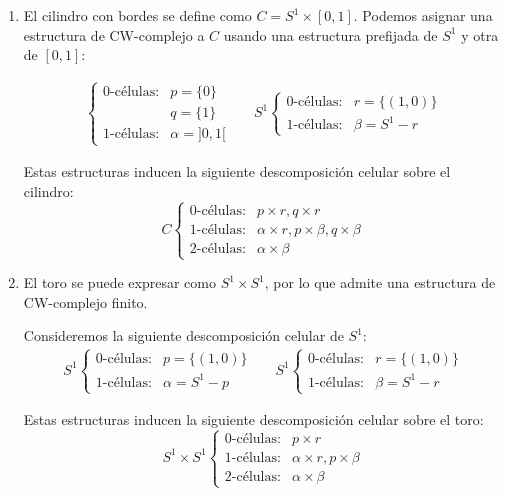 \begin{example}
\begin{enumerate}
\item El cilindro con bordes se define como $C=S^1\times [0,1]$. Podemos
asignar una estructura de CW-complejo a $C$ usando una estructura prefijada
de $S^1$ y otra de $[0,1]$:

\begin{align*}
[0,1]
\begin{cases}
\text{0-células:}	&p=\{0\}\\
					&q=\{1\}\\
\text{1-células:}	&\alpha=]0,1[
\end{cases}
&&
S^1
\begin{cases}
\text{0-células:}	&r=\{(1,0)\}\\
\text{1-células:}	&\beta=S^1-r
\end{cases}
\end{align*}

Estas estructuras inducen la siguiente descomposición celular sobre el cilindro:
\[C \begin{cases}
\text{0-células:}	&p\times r, q\times r\\
\text{1-células:}	&\alpha \times r, p\times \beta, q\times \beta\\
\text{2-células:}	&\alpha \times \beta
\end{cases}\]

\item El toro se puede expresar como $S^1\times S^1$, por lo que admite una
estructura de CW-complejo finito.

Consideremos la siguiente descomposición celular de $S^1$:
\begin{align*}
S^1
\begin{cases}
\text{0-células:}	&p=\{(1,0)\}\\
\text{1-células:}	&\alpha=S^1-p
\end{cases}
&&
S^1
\begin{cases}
\text{0-células:}	&r=\{(1,0)\}\\
\text{1-células:}	&\beta=S^1-r
\end{cases}
\end{align*}

Estas estructuras inducen la siguiente descomposición celular sobre el toro:
\[S^1\times S^1
\begin{cases}
\text{0-células:}&p\times r\\
\text{1-células:}&\alpha \times r,p\times \beta\\
\text{2-células:}&\alpha \times \beta
\end{cases}\]
\end{enumerate}
\end{example}

